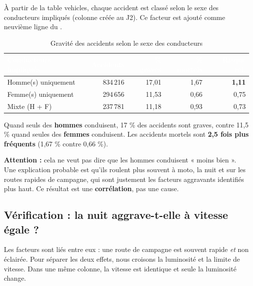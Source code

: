 \documentclass[11pt,a4paper]{report}
\newcommand{\hd}[1]{\textcolor{white}{\bfseries #1}}
\newcommand{\headrow}{\rowcolor{primary}}
\newcommand{\code}[1]{\texttt{\detokenize{#1}}}
\begin{document}
À partir de la table vehicles, chaque accident est classé selon le sexe des conducteurs impliqués (colonne \code{sexe_conducteurs} créée au J2). Ce facteur est ajouté comme neuvième ligne du \code{STACK}.

\begin{table}[H]
\centering
{}
\begin{tabular}{@{}l r r r r@{}}
\toprule
\headrow \hd{Conducteurs impliqués} & \hd{Accidents} & \hd{\% graves} & \hd{\% mortels} & \hd{Risque rel.} \\
\midrule
Homme(s) uniquement & 834\,216 & 17,01 & 1,67 & \textbf{1,11} \\
Femme(s) uniquement & 294\,656 & 11,53 & 0,66 & 0,75 \\
Mixte (H + F) & 237\,781 & 11,18 & 0,93 & 0,73 \\
\bottomrule
\end{tabular}
\caption{Gravité des accidents selon le sexe des conducteurs}
\end{table}

\begin{keybox}
Quand seuls des \textbf{hommes} conduisent, 17 \% des accidents sont graves, contre 11,5 \% quand seules des \textbf{femmes} conduisent. Les accidents mortels sont \textbf{2,5 fois plus fréquents} (1,67 \% contre 0,66 \%).

\textbf{Attention :} cela ne veut pas dire que les hommes conduisent « moins bien ». Une explication probable est qu'ils roulent plus souvent à moto, la nuit et sur les routes rapides de campagne, qui sont justement les facteurs aggravants identifiés plus haut. Ce résultat est une \textbf{corrélation}, pas une cause.
\end{keybox}

\subsection{Vérification : la nuit aggrave-t-elle à vitesse égale ?}

Les facteurs sont liés entre eux : une route de campagne est souvent rapide \emph{et} non éclairée. Pour séparer les deux effets, nous croisons la luminosité et la limite de vitesse. Dans une même colonne, la vitesse est identique et seule la luminosité change.
\end{document}
